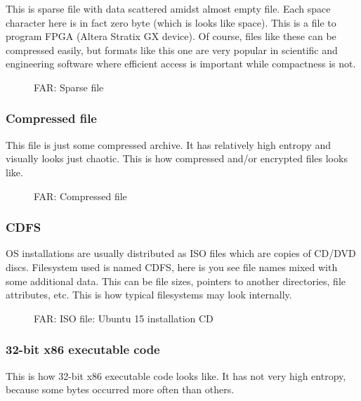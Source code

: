 This is sparse file with data scattered amidst almost empty file.
Each space character here is in fact zero byte (which is looks like space).
This is a file to program FPGA (Altera Stratix GX device).
Of course, files like these can be compressed easily, but formats like this one are very popular in scientific and engineering software where efficient access is important while compactness is not.

\begin{figure}[H]
\centering
{}
\caption{FAR: Sparse file}
\end{figure}

\clearpage
\subsubsection{Compressed file}

This file is just some compressed archive.
It has relatively high entropy and visually looks just chaotic.
This is how compressed and/or encrypted files looks like.

\begin{figure}[H]
\centering
{}
\caption{FAR: Compressed file}
\end{figure}

\clearpage
\subsubsection{\ac{CDFS}}

\ac{OS} installations are usually distributed as ISO files which are copies of CD/DVD discs.
Filesystem used is named \ac{CDFS}, here is you see file names mixed with some additional data.
This can be file sizes, pointers to another directories, file attributes, etc.
This is how typical filesystems may look internally.

\begin{figure}[H]
\centering
{}
\caption{FAR: ISO file: Ubuntu 15 installation \ac{CD}}
\end{figure}

\clearpage
\subsubsection{32-bit x86 executable code}

This is how 32-bit x86 executable code looks like.
It has not very high entropy, because some bytes occurred more often than others.

